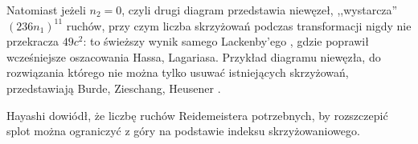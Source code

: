 Natomiast jeżeli $n_2 = 0$, czyli drugi diagram przedstawia niewęzeł, ,,wystarcza'' $(236n_1)^{11}$ ruchów, przy czym liczba skrzyżowań podczas transformacji nigdy nie przekracza $49c^2$: to świeższy wynik samego Lackenby'ego \cite{lackenby15}, gdzie poprawił wcześniejsze oszacowania Hassa, Lagariasa.
Przykład diagramu niewęzła, do rozwiązania którego nie można tylko usuwać istniejących skrzyżowań, przedstawiają Burde, Zieschang, Heusener \cite[s. 12]{burde14}.

Hayashi \cite{hayashi05} dowiódł, że liczbę ruchów Reidemeistera potrzebnych, by rozszczepić splot można ograniczyć z góry na podstawie indeksu skrzyżowaniowego.
%


